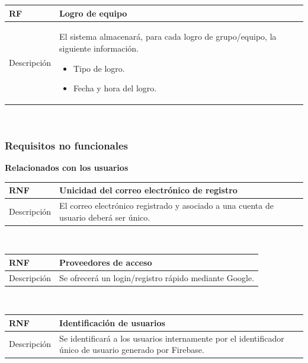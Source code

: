 \documentclass[twoside]{report}
\newcommand\addrow[2]{#1 &#2\\ }
\newcommand\addheading[2]{#1 &#2\\ \hline}
\newcommand\tabularhead{\begin{tabular}{lp{0.7\textwidth}}
\hline
}
\newenvironment{req}{\tabularhead}
{\hline\end{tabular}}
\begin{document}
\vspace{0.25cm}

\begin{req}
	\addheading{\textbf{RF\arabic{functionalRequirements}}}{Logro de equipo}
	\addrow{Descripción}{
	El sistema almacenará, para cada logro de grupo/equipo, la siguiente información.
	\begin{multicols}{2}
	\begin{itemize}
		\item Tipo de logro.
		\item Fecha y hora del logro.
	\end{itemize}
	\end{multicols}
	}
\end{req}\\

\vspace{1cm}

\subsubsection{Requisitos no funcionales}

\textbf{Relacionados con los usuarios}\\

\begin{req}
	\addheading{\textbf{RNF\arabic{nonFunctionalRequirements}}}{Unicidad del correo electrónico de registro}
	\addrow{Descripción}{El correo electrónico registrado y asociado a una cuenta de usuario deberá ser único.}
\end{req}\\

\vspace{0.25cm}

\begin{req}
	\addheading{\textbf{RNF\arabic{nonFunctionalRequirements}}}{Proveedores de acceso}
	\addrow{Descripción}{Se ofrecerá un login/registro rápido mediante Google.}
\end{req}\\

\vspace{0.25cm}

\begin{req}
	\addheading{\textbf{RNF\arabic{nonFunctionalRequirements}}}{Identificación de usuarios}
	\addrow{Descripción}{Se identificará a los usuarios internamente por el identificador único de usuario generado por Firebase.}
\end{req}\\
\end{document}
